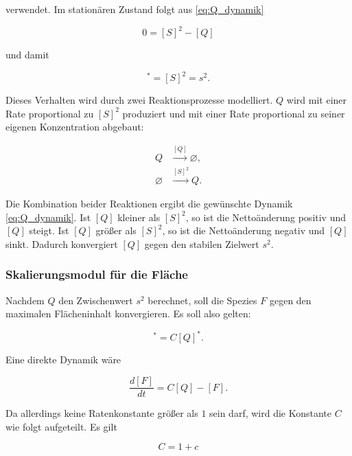 verwendet. Im stationären Zustand folgt aus \eqref{eq:Q_dynamik}

\begin{equation}
    0=[S]^2-[Q]
\end{equation}

und damit

\begin{equation}
    [Q]^*=[S]^2=s^2.
\end{equation}

Dieses Verhalten wird durch zwei Reaktionsprozesse modelliert. \(Q\) wird mit einer Rate proportional zu \([S]^2\) produziert und mit einer Rate proportional zu seiner eigenen Konzentration abgebaut:

\begin{equation}
\begin{aligned}
    Q &\xrightarrow{[Q]} \varnothing, \\
    \varnothing &\xrightarrow{[S]^2} Q.
\end{aligned}
\end{equation}

Die Kombination beider Reaktionen ergibt die gewünschte Dynamik
\eqref{eq:Q_dynamik}. Ist \([Q]\) kleiner als \([S]^2\), so ist die
Nettoänderung positiv und \([Q]\) steigt. Ist \([Q]\) größer als \([S]^2\),
so ist die Nettoänderung negativ und \([Q]\) sinkt. Dadurch konvergiert
\([Q]\) gegen den stabilen Zielwert \(s^2\).

\subsubsection{Skalierungsmodul für die Fläche}

Nachdem \(Q\) den Zwischenwert \(s^2\) berechnet, soll die Spezies \(F\)
gegen den maximalen Flächeninhalt konvergieren. Es soll also gelten:

\begin{equation}
    [F]^*=C[Q]^*.
\end{equation}

Eine direkte Dynamik wäre

\begin{equation}
    \frac{d[F]}{dt}
    =
    C[Q]-[F].
\end{equation}

Da allerdings keine Ratenkonstante größer als \(1\) sein darf, wird die Konstante \(C\) wie folgt aufgeteilt. Es gilt

\begin{equation}
    C = 1+c
    \label{eq:C_zerlegung}
\end{equation}

